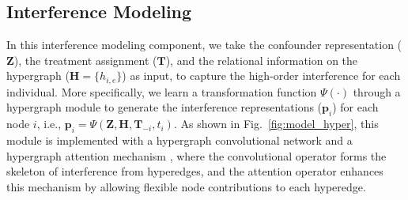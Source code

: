 
\vspace{-2mm}
\subsection{Interference Modeling}
In this interference modeling component, we take the 
confounder representation ($\textbf{Z}$), the treatment assignment ($\mathbf{T}$), and the relational information on the hypergraph ($\textbf{H}=\{h_{i,e}\}$) as input, to capture the high-order interference for each individual. 
More specifically, we learn a transformation function $\Psi(\cdot)$ through a hypergraph module to generate the interference representations ($\mathbf{p}_i$) for each node $i$, i.e.,
$\mathbf{p}_i=\Psi(\mathbf{Z}, \mathbf{H}, \mathbf{T}_{-i}, t_i)$. As shown in Fig.~\ref{fig:model_hyper}, this module is implemented with a hypergraph convolutional network \cite{yadati2018hypergcn,bai2021hypergraph} and a hypergraph attention mechanism \cite{bai2021hypergraph,zhang2019hyper,ding2020more}, where the convolutional operator forms the skeleton of interference from hyperedges, and the attention operator enhances this mechanism by allowing flexible node contributions to each hyperedge. %

\vspace{-2mm}
